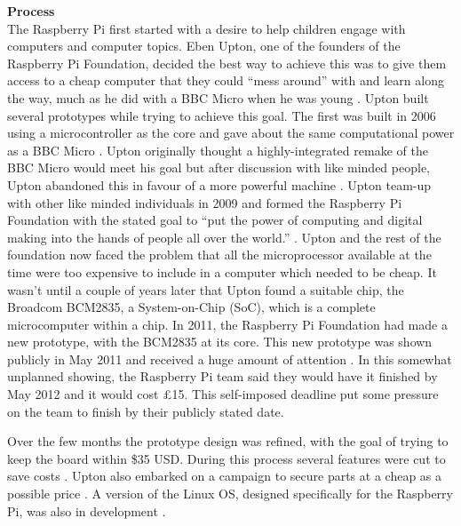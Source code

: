\textbf{Process}\\
The Raspberry Pi first started with a desire to help children engage with computers and computer topics. Eben Upton, one of the founders of the Raspberry Pi Foundation, decided the best way to achieve this was to give them access to a cheap computer that they could ``mess around''  with and learn along the way, much as he did with a BBC Micro when he was young 
\cite{RN98}. Upton built several prototypes while trying to achieve this goal. The first was built in 2006 using a microcontroller as the core and gave about the same computational power as a BBC Micro 
\cite{RN137}. Upton originally thought a highly-integrated remake of the BBC Micro would meet his goal but after discussion with like minded people, Upton abandoned this in favour of a more powerful machine 
\cite{RN98}. Upton team-up with other like minded individuals in 2009 and formed the Raspberry Pi Foundation with the stated goal to ``put the power of computing and digital making into the hands of people all over the world.'' 
\cite{RN138}. Upton and the rest of the foundation now faced the problem that all the microprocessor available at the time were too expensive to include in a computer which needed to be cheap. It wasn't until a couple of years later that Upton found a suitable chip, the Broadcom BCM2835, a System-on-Chip (SoC), which is a complete microcomputer within a chip. In 2011, the Raspberry Pi Foundation had made a new prototype, with the BCM2835 at its core. This new prototype was shown publicly in May 2011 and received a huge amount of attention 
\cite{RN140}. In this somewhat unplanned showing, the Raspberry Pi team said they would have it finished by May 2012 and it would cost \pounds 15. This self-imposed deadline put some pressure on the team to finish by their publicly stated date.  

Over the few months the prototype design was refined, with the goal of trying to keep the board within \$35 USD. During this process several features were cut to save costs 
\cite{RN98}. Upton also embarked on a campaign to secure parts at a cheap as a possible price 
\cite{RN98}. A version of the Linux OS, designed specifically for the Raspberry Pi, was also in development 
\cite{RN98}.

